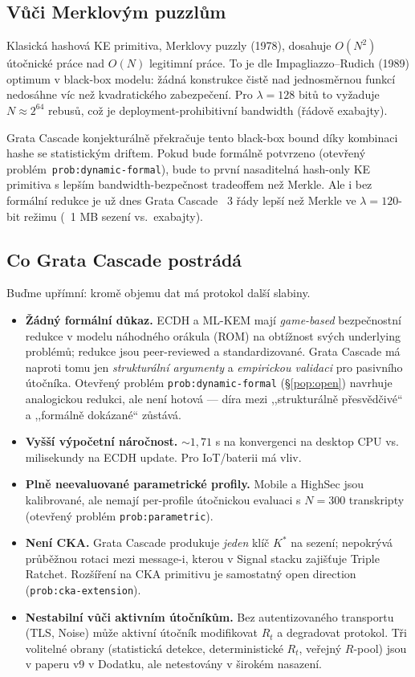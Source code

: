 \documentclass[11pt,a4paper]{article}
\begin{document}
\subsection{Vůči Merklovým puzzlům}

Klasická hashová KE primitiva, Merklovy puzzly (1978), dosahuje $O(N^2)$ útočnické práce nad $O(N)$ legitimní práce. To je dle Impagliazzo--Rudich (1989) optimum v black-box modelu: žádná konstrukce čistě nad jednosměrnou funkcí nedosáhne víc než kvadratického zabezpečení. Pro $\lambda = 128$ bitů to vyžaduje $N \approx 2^{64}$ rebusů, což je deployment-prohibitivní bandwidth (řádově exabajty).

Grata Cascade konjekturálně překračuje tento black-box bound díky kombinaci hashe se statistickým driftem. Pokud bude formálně potvrzeno (otevřený problém~\texttt{prob:dynamic-formal}), bude to první nasaditelná hash-only KE primitiva s lepším bandwidth-bezpečnost tradeoffem než Merkle. Ale i bez formální redukce je už dnes Grata Cascade ~3 řády lepší než Merkle ve $\lambda = 120$-bit režimu (~1 MB sezení vs.\ exabajty).

\subsection{Co Grata Cascade postrádá}

Buďme upřímní: kromě objemu dat má protokol další slabiny.

\begin{itemize}[leftmargin=*]
\item \textbf{Žádný formální důkaz.} ECDH a ML-KEM mají \emph{game-based} bezpečnostní redukce v modelu náhodného orákula (ROM) na obtížnost svých underlying problémů; redukce jsou peer-reviewed a standardizované. Grata Cascade má naproti tomu jen \emph{strukturální argumenty} a \emph{empirickou validaci} pro pasivního útočníka. Otevřený problém \texttt{prob:dynamic-formal} (§\ref{pop:open}) navrhuje analogickou redukci, ale není hotová --- díra mezi ,,strukturálně přesvědčivé`` a ,,formálně dokázané`` zůstává.
\item \textbf{Vyšší výpočetní náročnost.} $\sim 1{,}71$ s na konvergenci na desktop CPU vs. milisekundy na ECDH update. Pro IoT/baterii má vliv.
\item \textbf{Plně neevaluované parametrické profily.} Mobile a HighSec jsou kalibrované, ale nemají per-profile útočnickou evaluaci s $N = 300$ transkripty (otevřený problém \texttt{prob:parametric}).
\item \textbf{Není CKA.} Grata Cascade produkuje \emph{jeden} klíč $K^*$ na sezení; nepokrývá průběžnou rotaci mezi message-i, kterou v Signal stacku zajišťuje Triple Ratchet. Rozšíření na CKA primitivu je samostatný open direction (\texttt{prob:cka-extension}).
\item \textbf{Nestabilní vůči aktivním útočníkům.} Bez autentizovaného transportu (TLS, Noise) může aktivní útočník modifikovat $R_t$ a degradovat protokol. Tři volitelné obrany (statistická detekce, deterministické $R_t$, veřejný $R$-pool) jsou v paperu v9 v Dodatku, ale netestovány v širokém nasazení.
\end{itemize}
\end{document}
